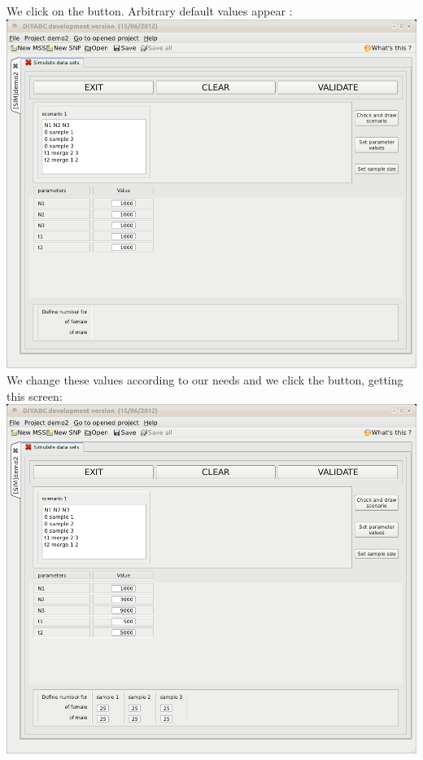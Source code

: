 We click on the   button. Arbitrary default values appear :\\

\includegraphics[scale=0.33]{gui_pictures/Capture-DIYABC-67.png} \\

We change these values according to our needs and we click the  button, getting this screen:\\

\includegraphics[scale=0.33]{gui_pictures/Capture-DIYABC-68.png} \\

